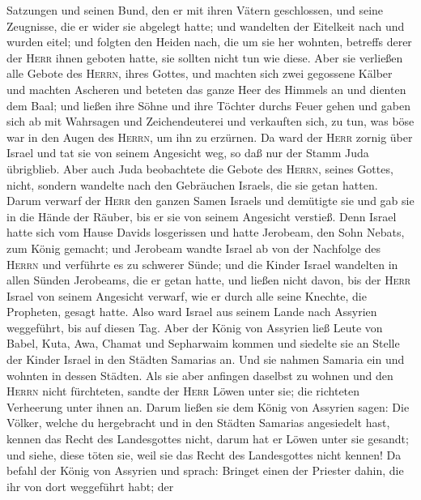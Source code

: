 Satzungen und seinen Bund, den er mit ihren Vätern geschlossen, und
seine Zeugnisse, die er wider sie abgelegt hatte; und wandelten der
Eitelkeit nach und wurden eitel; und folgten den Heiden nach, die um sie
her wohnten, betreffs derer der \textsc{Herr} ihnen geboten hatte, sie
sollten nicht tun wie diese.  Aber sie verließen alle
Gebote des \textsc{Herrn}, ihres Gottes, und machten sich zwei gegossene
Kälber und machten Ascheren und beteten das ganze Heer des Himmels an
und dienten dem Baal;  und ließen ihre Söhne und ihre
Töchter durchs Feuer gehen und gaben sich ab mit Wahrsagen und
Zeichendeuterei und verkauften sich, zu tun, was böse war in den Augen
des \textsc{Herrn}, um ihn zu erzürnen.  Da ward der
\textsc{Herr} zornig über Israel und tat sie von seinem Angesicht weg,
so daß nur der Stamm Juda übrigblieb.  Aber auch Juda
beobachtete die Gebote des \textsc{Herrn}, seines Gottes, nicht, sondern
wandelte nach den Gebräuchen Israels, die sie getan hatten.
 Darum verwarf der \textsc{Herr} den ganzen Samen Israels
und demütigte sie und gab sie in die Hände der Räuber, bis er sie von
seinem Angesicht verstieß.  Denn Israel hatte sich vom
Hause Davids losgerissen und hatte Jerobeam, den Sohn Nebats, zum König
gemacht; und Jerobeam wandte Israel ab von der Nachfolge des
\textsc{Herrn} und verführte es zu schwerer Sünde;  und
die Kinder Israel wandelten in allen Sünden Jerobeams, die er getan
hatte, und ließen nicht davon,  bis der \textsc{Herr}
Israel von seinem Angesicht verwarf, wie er durch alle seine Knechte,
die Propheten, gesagt hatte. Also ward Israel aus seinem Lande nach
Assyrien weggeführt, bis auf diesen Tag.  Aber der König
von Assyrien ließ Leute von Babel, Kuta, Awa, Chamat und Sepharwaim
kommen und siedelte sie an Stelle der Kinder Israel in den Städten
Samarias an. Und sie nahmen Samaria ein und wohnten in dessen Städten.
 Als sie aber anfingen daselbst zu wohnen und den
\textsc{Herrn} nicht fürchteten, sandte der \textsc{Herr} Löwen unter
sie; die richteten Verheerung unter ihnen an.  Darum
ließen sie dem König von Assyrien sagen: Die Völker, welche du
hergebracht und in den Städten Samarias angesiedelt hast, kennen das
Recht des Landesgottes nicht, darum hat er Löwen unter sie gesandt; und
siehe, diese töten sie, weil sie das Recht des Landesgottes nicht
kennen!  Da befahl der König von Assyrien und sprach:
Bringet einen der Priester dahin, die ihr von dort weggeführt habt; der

